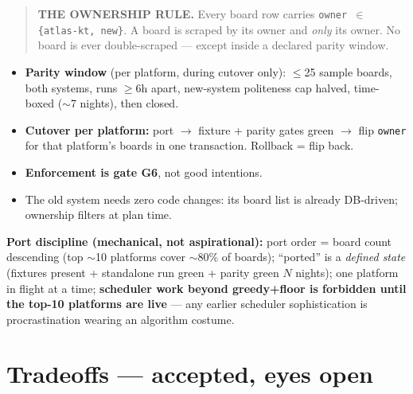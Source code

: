 \documentclass[11pt,a4paper]{article}
\newcommand{\law}[1]{\textbf{\textcolor{blue!50!black}{#1}}}
\begin{document}
\begin{quote}
\law{THE OWNERSHIP RULE.} Every board row carries \texttt{owner $\in$ \{atlas-kt, new\}}. A board is
scraped by its owner and \emph{only} its owner. No board is ever double-scraped --- except inside a
declared parity window.
\end{quote}

\begin{itemize}
\item \textbf{Parity window} (per platform, during cutover only): $\leq$25 sample boards, both systems,
runs $\geq$6h apart, new-system politeness cap halved, time-boxed ($\sim$7 nights), then closed.
\item \textbf{Cutover per platform:} port $\rightarrow$ fixture + parity gates green $\rightarrow$ flip
\texttt{owner} for that platform's boards in one transaction. Rollback = flip back.
\item \textbf{Enforcement is gate G6}, not good intentions.
\item The old system needs zero code changes: its board list is already DB-driven; ownership filters at
plan time.
\end{itemize}

\textbf{Port discipline (mechanical, not aspirational):} port order = board count descending (top $\sim$10
platforms cover $\sim$80\% of boards); ``ported'' is a \emph{defined state} (fixtures present + standalone
run green + parity green $N$ nights); one platform in flight at a time; \textbf{scheduler work beyond
greedy+floor is forbidden until the top-10 platforms are live} --- any earlier scheduler sophistication is
procrastination wearing an algorithm costume.

\section{Tradeoffs --- accepted, eyes open}
\end{document}
